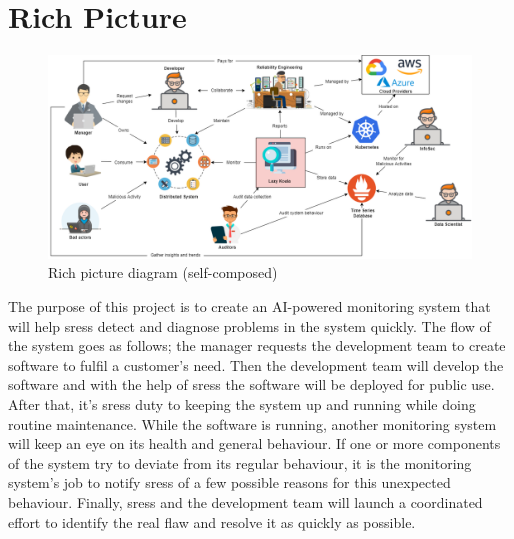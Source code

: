 \section{Rich Picture}

\begin{figure}[H]
    \includegraphics[width=16cm]{assets/requirement-specification/rich-picture.png}
    \caption{Rich picture diagram (self-composed)}
    \label{fig:rich-picture}
\end{figure}

The purpose of this project is to create an AI-powered monitoring system that will help \acp{sres} detect and diagnose problems in the system quickly. The flow of the system goes as follows; the manager requests the development team to create software to fulfil a customer's need. Then the development team will develop the software and with the help of \acp{sres} the software will be deployed for public use. After that, it's \acp{sres} duty to keeping the system up and running while doing routine maintenance. While the software is running, another monitoring system will keep an eye on its health and general behaviour. If one or more components of the system try to deviate from its regular behaviour, it is the monitoring system's job to notify \acp{sres} of a few possible reasons for this unexpected behaviour. Finally, \acp{sres} and the development team will launch a coordinated effort to identify the real flaw and resolve it as quickly as possible. 